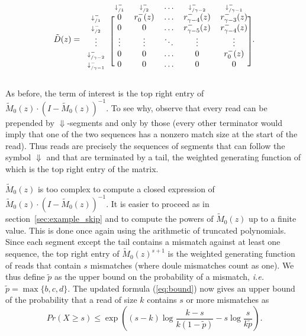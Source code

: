 \documentclass{article}
\begin{document}
\begin{equation*}
\tilde{D}(z) = 
\begin{blockarray}{cccccc}
   & \scriptstyle{\downarrow_{/1}^-} & \scriptstyle{\downarrow_{/2}^-} &
    \ldots & \scriptstyle{\downarrow_{/\gamma-2}^-} &
    \scriptstyle{\downarrow_{/\gamma-1}^-} \\
\begin{block}{c[ccccc]}
\scriptstyle{\downarrow_{/1}^-} & 0 & r_0^-(z) & \ldots &
    r_{\gamma-4}^-(z) & r_{\gamma-3}^-(z) \\
\scriptstyle{\downarrow_{/2}^-} & 0 & 0 & \ldots &
    r_{\gamma-5}^-(z) & r_{\gamma-4}^-(z) \\
\vdots & \vdots & \vdots & \ddots & \vdots & \vdots \\
\scriptstyle{\downarrow_{/\gamma-2}^-} & 0 & 0 & \ldots & 0 & r_0^-(z) \\
\scriptstyle{\downarrow_{/\gamma-1}^-} & 0 & 0 & \ldots & 0 & 0 \\
\end{block}
\end{blockarray}.
\end{equation*}

As before, the term of interest is the top right entry of
$\tilde{M}_0(z)\cdot(I-\tilde{M}_0(z))^{-1}$. To see why, observe that
every read can be prepended by $\Downarrow$-segments and only by those
(every other terminator would imply that one of the two sequences has a
nonzero match size at the start of the read). Thus reads are precisely the
sequences of segments that can follow the symbol $\Downarrow$ and that are
terminated by a tail, the weighted generating function of which is the top
right entry of the matrix.

$\tilde{M}_0(z)$ is too complex to compute a closed expression of
$\tilde{M}_0(z)\cdot(I-\tilde{M}_0(z))^{-1}$. It is easier to proceed as
in section~\ref{sec:example_skip} and to compute the powers of
$\tilde{M}_0(z)$ up to a finite value. This is done once again using the
arithmetic of truncated polynomials. Since each segment except the tail
contains a mismatch against at least one sequence, the top right entry of
$\tilde{M}_0(z)^{s+1}$ is the weighted generating function of reads that
contain $s$ mismatches (where doule mismatches count as one). We thus
define $\tilde{p}$ as the upper bound on the probability of a mismatch,
\textit{i.e.} $\tilde{p} = \max\{b,c,d\}$. The updated formula
(\ref{eq:bound}) now gives an upper bound of the probability that a read
of size $k$ contains $s$ or more mismatches as
\begin{equation*}
Pr(X \geq s) \leq \exp \left( (s-k)\log \frac{k-s}{k(1-\tilde{p})} -s\log
\frac{s}{k\tilde{p}} \right).
\end{equation*}
\end{document}
